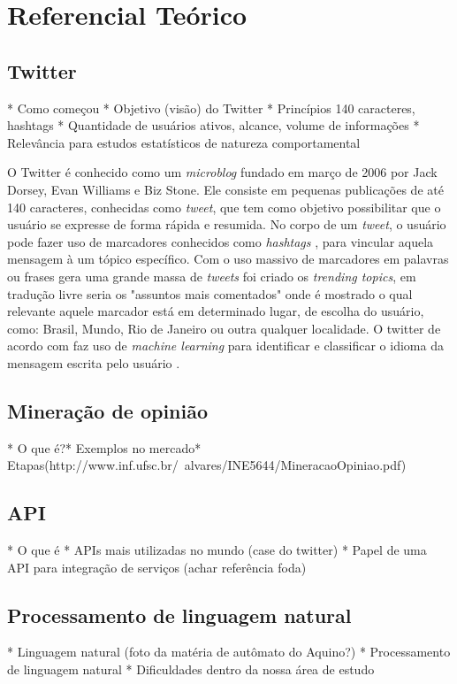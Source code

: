 \chapter{Referencial Teórico}\label{cap:referencial_teorico}

\section{Twitter}\label{sec:twitter}

* Como começou
* Objetivo (visão) do Twitter
* Princípios 140 caracteres, hashtags
* Quantidade de usuários ativos, alcance, volume de informações
* Relevância para estudos estatísticos de natureza comportamental

O Twitter é conhecido como um \emph{microblog} fundado em março de 2006 por Jack Dorsey, Evan Williams e Biz Stone. Ele consiste em pequenas publicações de até 140 caracteres, conhecidas como \emph{tweet}, que tem como objetivo possibilitar que o usuário se expresse de forma rápida e resumida. No corpo de um \emph{tweet}, o usuário pode fazer uso de marcadores conhecidos como \emph{hashtags} \cite{waite2012paperback}, para vincular aquela mensagem à um tópico específico. Com o uso massivo de marcadores em palavras ou frases gera uma grande massa de \emph{tweets} foi criado os \emph{trending topics}, em tradução livre seria os "assuntos mais comentados" onde é mostrado o qual relevante aquele marcador está em determinado lugar, de escolha do usuário, como: Brasil, Mundo, Rio de Janeiro ou outra qualquer localidade. O twitter de acordo com  faz uso de \emph{machine learning} para identificar e classificar o idioma da mensagem escrita pelo usuário \cite{arneromannkurrik2013}.


\section{Mineração de opinião}\label{sec:mineracao_dados}

* O que é?* Exemplos no mercado* Etapas(http://www.inf.ufsc.br/~alvares/INE5644/MineracaoOpiniao.pdf)

\section{API}\label{sec:api}
* O que é
* APIs mais utilizadas no mundo (case do twitter)
* Papel de uma API para integração de serviços (achar referência foda)

\section{Processamento de linguagem natural}\label{sec:nlp}
* Linguagem natural (foto da matéria de autômato do Aquino?)
* Processamento de linguagem natural
* Dificuldades dentro da nossa área de estudo


